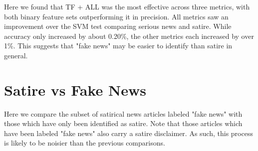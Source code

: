\documentclass [12 pt] {report}
\begin{document}
\vspace*{-2mm}
\begin{table}[H]
\small
{}
\label{table:SVM Serious vs Fake}
\end{table}
Here we found that TF + ALL was the most effective across three metrics, with both binary feature sets outperforming it in precision. All metrics saw an improvement over the SVM test comparing serious news and satire. While accuracy only increased by about 0.20\%, the other metrics each increased by over 1\%. This suggests that "fake news" may be easier to identify than satire in general.

\section{Satire vs Fake News}
Here we compare the subset of satirical news articles labeled "fake news" with those which have only been identified as satire. Note that those articles which have been labeled "fake news" also carry a satire disclaimer. As such, this process is likely to be noisier than the previous comparisons.

\vspace*{-2mm}
\begin{table}[H]
\small
{}
\label{table:SVM Satire vs Fake}
\end{table}
\end{document}
